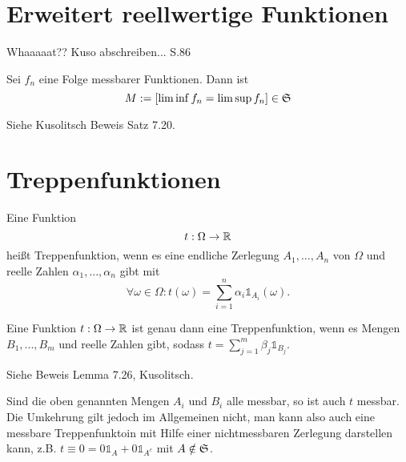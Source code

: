 			\begin{defi}[7.14]
				
			\end{defi}
			
		\section[Erweiterte $\R$-Funktionen]{Erweitert reellwertige Funktionen}
			Whaaaaat??\newline
			Kuso abschreiben... S.86\newline
			\begin{satz}
				Sei $f_n$ eine Folge messbarer Funktionen. Dann ist 
				\[ M:=[\liminf f_n=\limsup f_n]\in\mathfrak{S} \]
			\end{satz}
			
			\begin{bew}
				Siehe Kusolitsch Beweis Satz 7.20. 
			\end{bew}
			
			\begin{satz}[7.24]
				
			\end{satz}
			
		\section{Treppenfunktionen}
			\begin{defi}
				Eine Funktion 
				\[ t:\Omega\to\mathbb{R} \]
				heißt Treppenfunktion, wenn es eine endliche Zerlegung $A_1,...,A_n$ von $\Omega$ und reelle Zahlen $\alpha_1,...,\alpha_n$ gibt mit
				\[ \forall \omega\in\Omega: t(\omega)=\sum_{i=1}^n\alpha_i\mathds{1}_{A_i}(\omega). \]
			\end{defi}
			
			\begin{lemma}
				Eine Funktion $t:\Omega\to\mathbb{R}$ ist genau dann eine Treppenfunktion, wenn es Mengen $B_1,...,B_m$ und reelle Zahlen gibt, sodass $t=\sum_{j=1}^m\beta_j\mathds{1}_{B_j}$. 
			\end{lemma}
			
			\begin{bew}
				Siehe Beweis Lemma 7.26, Kusolitsch.
			\end{bew}
			
			\begin{bem}
				Sind die oben genannten Mengen $A_i$ und $B_i$ alle messbar, so ist auch $t$ messbar. Die Umkehrung gilt jedoch im Allgemeinen nicht, man kann also auch eine messbare Treppenfunktoin mit Hilfe einer nichtmessbaren Zerlegung darstellen kann, z.B. $t\equiv 0=0\mathds{1}_A+0\mathds{1}_{A^c}$ mit $A\notin \mathfrak{S}$. 
			\end{bem}
			
